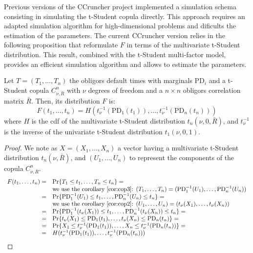 \documentclass[11pt,fleqn]{book} %
\begin{document}
Previous versions of the CCruncher project implemented a simulation schema
consisting in simulating the t-Student copula directly. This approach 
requires an adapted simulation algorithm for high-dimensional problems and 
dificults the estimation of the parameters. The current CCruncher version 
relies in the following proposition that reformulate $F$ in terms of the 
multivariate t-Student distribution. This result, combined with the t-Student
multi-factor model, provides an efficient simulation algorithm and allows 
to estimate the parameters.

\begin{proposition}
	\label{prop:dtd}
	Let $T=(T_1,\dots,T_n)$ the obligors default times with marginals 
	$\text{PD}_i$ and a t-Student copula $C_{\nu,\bar{R}}^n$ with $\nu$
	degrees of freedom and a $n {\times} n$ obligors correlation matrix 
	$\bar{R}$. Then, its distribution $F$ is:
	\begin{displaymath}
		F(t_1,\dots,t_n) = H\left(t_\nu^{-1}(\text{PD}_1(t_1)), \dots, t_\nu^{-1}(\text{PD}_n(t_n))\right)
	\end{displaymath}
	where $H$ is the cdf of the multivariate t-Student distribution 
	$t_n(\nu,0,\bar{R})$, and $t_\nu^{-1}$ is the inverse of the univariate 
	t-Student distribution $t_1(\nu,0,1)$.
\end{proposition}
\begin{proof}
	We note as $X=(X_1,\dots,X_n)$ a vector having a multivariate t-Student
	distribution $t_n(\nu,\bar{R})$, and $(U_1,\dots,U_n)$ to represent
	the components of the copula $C_{\nu,\bar{R}}^n$.
	\begin{displaymath}
		\begin{array}{rl}
			F(t_1,\dots,t_n) = & \Pr\{ T_1 \le t_1 , \dots, T_n \le t_n \} =                                    \\
			                   & \text{we use the corollary \ref{cor:cop3}: }                                   
			(T_1,\dots,T_n) = (\text{PD}_1^{-1}(U_1),\dots,\text{PD}_n^{-1}(U_n)) \\
			=                  & \Pr\{ \text{PD}_1^{-1}(U_1) \le t_1 , \dots , \text{PD}_n^{-1}(U_n) \le t_n \} =               \\
			                   & \text{we use the corollary \ref{cor:cop2}: }                                   
			(U_1,\dots,U_n) = (t_\nu(X_1),\dots,t_\nu(X_n)) \\
			=                  & \Pr\{ \text{PD}_1^{-1}(t_\nu(X_1)) \le t_1 , \dots , \text{PD}_n^{-1}(t_\nu(X_n)) \le t_n \} = \\
			=                  & \Pr\{ t_\nu(X_1) \le \text{PD}_1(t_1) , \dots , t_\nu(X_n) \le \text{PD}_n(t_n) \} =           \\
			=                  & \Pr\{ X_1 \le t_\nu^{-1}(\text{PD}_1(t_1)) , \dots , X_n \le t_\nu^{-1}(\text{PD}_n(t_n)) \} = \\
			=                  & H(t_\nu^{-1}(\text{PD}_1(t_1)), \dots, t_\nu^{-1}(\text{PD}_n(t_n)))                           \\
		\end{array}
	\end{displaymath}
\end{proof}
\end{document}
